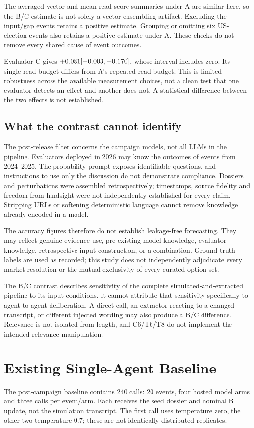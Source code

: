 \documentclass[10pt,conference]{IEEEtran}
\begin{document}
The averaged-vector and mean-read-score summaries under A are similar here,
so the B/C estimate is not solely a vector-ensembling artifact. Excluding the
input/gap events retains a positive estimate. Grouping or omitting six
US-election events also retains a positive estimate under A. These checks
do not remove every shared cause of event outcomes.

Evaluator C gives $+0.081 [-0.003, +0.170]$, whose interval includes zero. Its
single-read budget differs from A's repeated-read budget. This is limited
robustness across the available measurement choices, not a clean test that
one evaluator detects an effect and another does not. A statistical difference
between the two effects is not established.

\subsection{What the contrast cannot identify}
\label{sec:leakage}
The post-release filter concerns the campaign models, not all LLMs in the
pipeline. Evaluators deployed in 2026 may know the outcomes of events from
2024--2025. The probability prompt exposes identifiable questions, and
instructions to use only the discussion do not demonstrate compliance.
Dossiers and perturbations were assembled retrospectively; timestamps, source
fidelity and freedom from hindsight were not independently established for
every claim. Stripping URLs or softening deterministic language cannot remove
knowledge already encoded in a model.

The accuracy figures therefore do not establish leakage-free forecasting.
They may reflect genuine evidence use, pre-existing model knowledge, evaluator
knowledge, retrospective input construction, or a combination. Ground-truth
labels are used as recorded; this study does not independently adjudicate
every market resolution or the mutual exclusivity of every curated option set.

The B/C contrast describes sensitivity of the complete simulated-and-extracted
pipeline to its input conditions. It cannot attribute that sensitivity specifically
to agent-to-agent deliberation. A direct call, an extractor reacting to a changed
transcript, or different injected wording may also produce a B/C difference.
Relevance is not isolated from length, and C6/T6/T8 do not implement the intended
relevance manipulation.

\section{Existing Single-Agent Baseline}
\label{sec:cot}
The post-campaign baseline contains 240 calls: 20 events, four hosted model arms
and three calls per event/arm. Each receives the seed dossier and nominal B
update, not the simulation transcript. The first call uses temperature zero,
the other two temperature 0.7; these are not identically distributed replicates.
\end{document}
